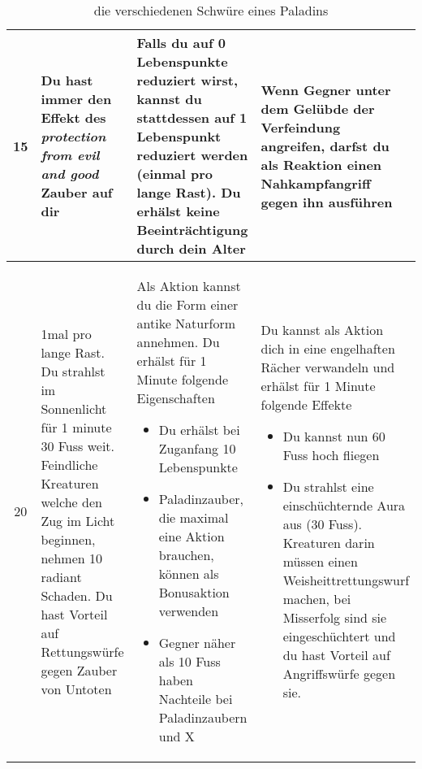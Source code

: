 \begin{table}
\begin{tabular}{cp{6cm}p{6cm}p{6cm}}
	15 &
	Du hast immer den Effekt des \textit{protection from evil and good} Zauber auf dir&
	Falls du auf 0 Lebenspunkte reduziert wirst, kannst du stattdessen auf 1 Lebenspunkt reduziert werden (einmal pro lange Rast). Du erhälst keine Beeinträchtigung durch dein Alter&
 	Wenn Gegner unter dem Gelübde der Verfeindung angreifen, darfst du als Reaktion einen Nahkampfangriff gegen ihn ausführen\\ \hline
	
	20 &
	1mal pro lange Rast. Du strahlst im Sonnenlicht für 1 minute 30 Fuss weit. Feindliche Kreaturen welche den Zug im Licht beginnen, nehmen 10 radiant Schaden. Du hast Vorteil auf Rettungswürfe gegen Zauber von Untoten &
	Als Aktion kannst du die Form einer antike Naturform annehmen. Du erhälst für 1 Minute folgende Eigenschaften
	\begin{itemize}
		\item Du erhälst bei Zuganfang 10 Lebenspunkte
		\item Paladinzauber, die maximal eine Aktion brauchen, können als Bonusaktion verwenden
		\item Gegner näher als 10 Fuss haben Nachteile bei Paladinzaubern und X
	\end{itemize}&
	Du kannst als Aktion dich in eine engelhaften Rächer verwandeln und erhälst für 1 Minute folgende Effekte
	\begin{itemize}
		\item Du kannst nun 60 Fuss hoch fliegen
		\item Du strahlst eine einschüchternde Aura aus (30 Fuss). Kreaturen darin müssen einen Weisheittrettungswurf machen, bei Misserfolg sind sie eingeschüchtert und du hast Vorteil auf Angriffswürfe gegen sie.
	\end{itemize}		
	\\ \hline	
	\end{tabular}
	\caption{die verschiedenen Schwüre eines Paladins}
\end{table}